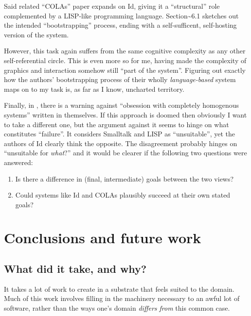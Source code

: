 Said related ``COLAs'' paper expands on Id{}, giving it a ``structural''
role complemented by a LISP-like programming language.
Section\textasciitilde{}6.1 sketches out the intended ``bootstrapping''
process, ending with a self-sufficent, self-hosting version of the
system.

However, this task again suffers from the same cognitive complexity as
any other self-referential circle. This is even more so for me, having
made the complexity of graphics and interaction somehow still ``part of
the system''. Figuring out exactly how the authors' bootstrapping
process of their wholly \emph{language-based} system maps on to my task
is, as far as I know, uncharted territory.

Finally, in \cite{crit-semprola}, there is a warning against ``obsession
with completely homogenous systems'' written in themselves. If this
approach is doomed then obviously I want to take a different one, but
the argument against it seems to hinge on what constitutes ``failure''.
It considers Smalltalk and LISP as ``unsuitable'', yet the authors of
Id{} clearly think the opposite. The disagreement probably hinges on
``unsuitable for \emph{what}?'' and it would be clearer if the following
two questions were answered:

\begin{enumerate}
\def\labelenumi{\arabic{enumi}.}
\tightlist
\item
  Is there a difference in (final, intermediate) goals between the two
  views?
\item
  Could systems like Id{} and COLAs plausibly succeed at their own
  stated goals?
\end{enumerate}

\hypertarget{conclusions-and-future-work}{%
\section{Conclusions and future
work}\label{conclusions-and-future-work}}

\hypertarget{what-did-it-take-and-why}{%
\subsection{What did it take, and why?}\label{what-did-it-take-and-why}}

It takes a lot of work to create in a substrate that feels suited to the
domain. Much of this work involves filling in the machinery necessary to
an awful lot of software, rather than the ways one's domain
\emph{differs from} this common case.

